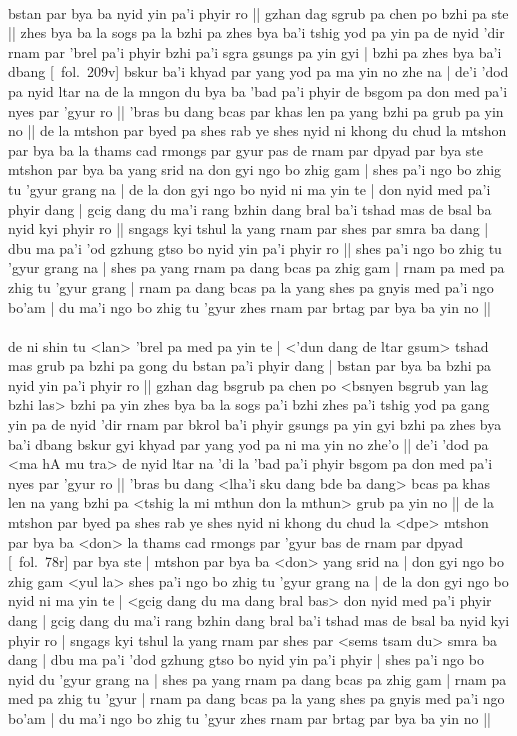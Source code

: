 \documentclass[12pt]{article}
\begin{document}
\textbf{\TVA}\\
bstan par bya ba nyid yin pa'i phyir ro || gzhan dag sgrub pa chen po bzhi pa ste || zhes bya ba la sogs pa la bzhi pa zhes bya ba'i tshig yod pa yin pa de nyid 'dir rnam par 'brel pa'i phyir bzhi pa'i sgra gsungs pa yin gyi | bzhi pa zhes bya ba'i dbang [\TVA\ fol.\ 209v] bskur ba'i khyad par yang yod pa ma yin no zhe na | de'i 'dod pa nyid ltar na de la mngon du bya ba 'bad pa'i phyir de bsgom pa don med pa'i nyes par 'gyur ro || 'bras bu dang bcas par khas len pa yang bzhi pa grub pa yin no || de la mtshon par byed pa shes rab ye shes nyid ni khong du chud la mtshon par bya ba la thams cad rmongs par gyur pas de rnam par dpyad par bya ste mtshon par bya ba yang srid na don gyi ngo bo zhig gam | shes pa'i ngo bo zhig tu 'gyur grang na | de la don gyi ngo bo nyid ni ma yin te | don nyid med pa'i phyir dang | gcig dang du ma'i rang bzhin dang bral ba'i tshad mas de bsal ba nyid kyi phyir ro || sngags kyi tshul la yang rnam par shes par smra ba dang | dbu ma pa'i 'od gzhung gtso bo nyid yin pa'i phyir ro || shes pa'i ngo bo zhig tu 'gyur grang na | shes pa yang rnam pa dang bcas pa zhig gam | rnam pa med pa zhig tu 'gyur grang | rnam pa dang bcas pa la yang shes pa gnyis med pa'i ngo bo'am | du ma'i ngo bo zhig tu 'gyur zhes rnam par brtag par bya ba yin no ||\\

\textbf{\TVB}\\
de ni shin tu <lan> 'brel pa med pa yin te | <'dun dang de ltar gsum> tshad mas grub pa bzhi pa gong du bstan pa'i phyir dang | bstan par bya ba bzhi pa nyid yin pa'i phyir ro || gzhan dag bsgrub pa chen po <bsnyen bsgrub yan lag bzhi las> bzhi pa yin zhes bya ba la sogs pa'i bzhi zhes pa'i tshig yod pa gang yin pa de nyid 'dir rnam par bkrol ba'i phyir gsungs pa yin gyi bzhi pa zhes bya ba'i dbang bskur gyi khyad par yang yod pa ni ma yin no zhe'o || de'i 'dod pa <ma hA mu tra> de nyid ltar na 'di la 'bad pa'i phyir bsgom pa don med pa'i nyes par 'gyur ro || 'bras bu dang <lha'i sku dang bde ba dang> bcas pa khas len na yang bzhi pa <tshig la mi mthun don la mthun> grub pa yin no || de la mtshon par byed pa shes rab ye shes nyid ni khong du chud la <dpe> mtshon par bya ba <don> la thams cad rmongs par 'gyur bas de rnam par dpyad [\TVB\ fol.\ 78r] par bya ste | mtshon par bya ba <don> yang srid na | don gyi ngo bo zhig gam <yul la> shes pa'i ngo bo zhig tu 'gyur grang na | de la don gyi ngo bo nyid ni ma yin te | <gcig dang du ma dang bral bas> don nyid med pa'i phyir dang | gcig dang du ma'i rang bzhin dang bral ba'i tshad mas de bsal ba nyid kyi phyir ro | sngags kyi tshul la yang rnam par shes par <sems tsam du> smra ba dang | dbu ma pa'i 'dod gzhung gtso bo nyid yin pa'i phyir | shes pa'i ngo bo nyid du 'gyur grang na | shes pa yang rnam pa dang bcas pa zhig gam | rnam pa med pa zhig tu 'gyur | rnam pa dang bcas pa la yang shes pa gnyis med pa'i ngo bo'am | du ma'i ngo bo zhig tu 'gyur zhes rnam par brtag par bya ba yin no || \\
\end{document}
